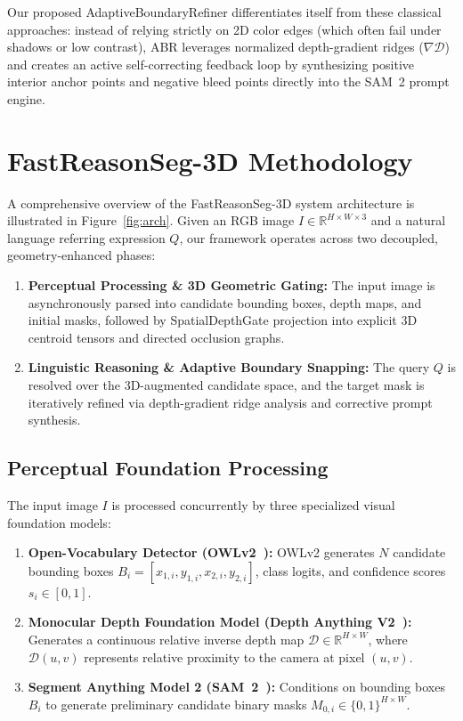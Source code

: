 \documentclass[10pt,twocolumn,letterpaper]{article}
\begin{document}
Our proposed AdaptiveBoundaryRefiner differentiates itself from these classical approaches: instead of relying strictly on 2D color edges (which often fail under shadows or low contrast), ABR leverages normalized depth-gradient ridges ($\nabla \mathcal{D}$) and creates an active self-correcting feedback loop by synthesizing positive interior anchor points and negative bleed points directly into the SAM~2 prompt engine.

\section{FastReasonSeg-3D Methodology}
\label{sec:method}

A comprehensive overview of the FastReasonSeg-3D system architecture is illustrated in Figure~\ref{fig:arch}. Given an RGB image $I \in \mathbb{R}^{H \times W \times 3}$ and a natural language referring expression $Q$, our framework operates across two decoupled, geometry-enhanced phases:
\begin{enumerate}[leftmargin=*,itemsep=1pt]
    \item \textbf{Perceptual Processing \& 3D Geometric Gating:} The input image is asynchronously parsed into candidate bounding boxes, depth maps, and initial masks, followed by SpatialDepthGate projection into explicit 3D centroid tensors and directed occlusion graphs.
    \item \textbf{Linguistic Reasoning \& Adaptive Boundary Snapping:} The query $Q$ is resolved over the 3D-augmented candidate space, and the target mask is iteratively refined via depth-gradient ridge analysis and corrective prompt synthesis.
\end{enumerate}

\subsection{Perceptual Foundation Processing}
The input image $I$ is processed concurrently by three specialized visual foundation models:
\begin{enumerate}[leftmargin=*,itemsep=2pt,topsep=1pt]
    \item \textbf{Open-Vocabulary Detector (OWLv2~\cite{minderer2024scaling}):} OWLv2 generates $N$ candidate bounding boxes $B_i = [x_{1,i}, y_{1,i}, x_{2,i}, y_{2,i}]$, class logits, and confidence scores $s_i \in [0, 1]$.
    \item \textbf{Monocular Depth Foundation Model (Depth Anything V2~\cite{yang2024depthanything}):} Generates a continuous relative inverse depth map $\mathcal{D} \in \mathbb{R}^{H \times W}$, where $\mathcal{D}(u,v)$ represents relative proximity to the camera at pixel $(u,v)$.
    \item \textbf{Segment Anything Model 2 (SAM~2~\cite{ravi2024sam2}):} Conditions on bounding boxes $B_i$ to generate preliminary candidate binary masks $M_{0,i} \in \{0, 1\}^{H \times W}$.
\end{enumerate}
\end{document}

